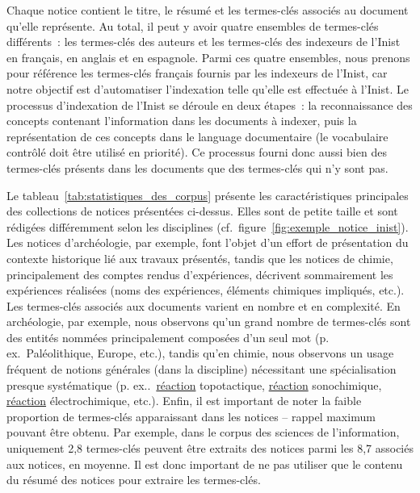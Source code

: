     Chaque notice contient le titre, le résumé et les termes-clés associés au
    document qu'elle représente. Au total, il peut y avoir quatre ensembles de
    termes-clés différents~: les termes-clés des auteurs et les termes-clés des
    indexeurs de l'Inist en français, en anglais et en espagnole. Parmi ces
    quatre ensembles, nous prenons pour référence les termes-clés français
    fournis par les indexeurs de l'Inist, car notre objectif est d'automatiser
    l'indexation telle qu'elle est effectuée à l'Inist. Le processus
    d'indexation de l'Inist se déroule en deux étapes~: la reconnaissance des
    concepts contenant l'information dans les documents à indexer, puis la
    représentation de ces concepts dans le language documentaire (le vocabulaire
    contrôlé doit être utilisé en priorité). Ce processus fourni donc aussi bien
    des termes-clés présents dans les documents que des termes-clés qui n'y sont
    pas.

    Le tableau~\ref{tab:statistiques_des_corpus} présente les caractéristiques
    principales des collections de notices présentées ci-dessus. Elles sont de
    petite taille et sont rédigées différemment selon les disciplines
    (cf.~figure~\ref{fig:exemple_notice_inist}). Les notices d'archéologie, par
    exemple, font l'objet d'un effort de présentation du contexte historique lié
    aux travaux présentés, tandis que les notices de chimie, principalement des
    comptes rendus d'expériences, décrivent sommairement les expériences
    réalisées (noms des expériences, éléments chimiques impliqués, etc.). Les
    termes-clés associés aux documents varient en nombre et en complexité. En
    archéologie, par exemple, nous observons qu'un grand nombre de termes-clés
    sont des entités nommées principalement composées d'un seul mot
    (p. ex.~\og{}Paléolithique\fg{}, \og{}Europe\fg{}, etc.), tandis qu'en
    chimie, nous observons un usage fréquent de notions générales (dans la
    discipline) nécessitant une spécialisation presque systématique
    (p. ex..~\og{}\underline{réaction} topotactique\fg{},
    \og{}\underline{réaction} sonochimique\fg{}, \og{}\underline{réaction}
    électrochimique\fg{}, etc.). Enfin, il est important de noter la faible
    proportion de termes-clés apparaissant dans les notices -- rappel maximum
    pouvant être obtenu. Par exemple, dans le corpus des sciences de
    l'information, uniquement 2,8 termes-clés peuvent être extraits des notices
    parmi les 8,7 associés aux notices, en moyenne. Il est donc important de ne
    pas utiliser que le contenu du résumé des notices pour extraire les
    termes-clés.

